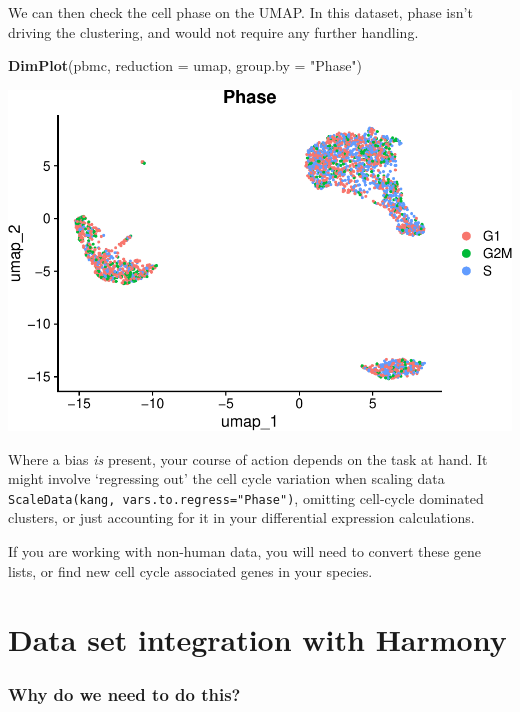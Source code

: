 \documentclass[
]{book}
\newenvironment{Shaded}{\begin{snugshade}}{\end{snugshade}}
\newcommand{\AttributeTok}[1]{\textcolor[rgb]{0.13,0.29,0.53}{#1}}
\newcommand{\FunctionTok}[1]{\textcolor[rgb]{0.13,0.29,0.53}{\textbf{#1}}}
\newcommand{\NormalTok}[1]{#1}
\newcommand{\StringTok}[1]{\textcolor[rgb]{0.31,0.60,0.02}{#1}}
\begin{document}
We can then check the cell phase on the UMAP. In this dataset, phase isn't driving the clustering, and would not require any further handling.

\begin{Shaded}
\begin{Highlighting}[]
\FunctionTok{DimPlot}\NormalTok{(pbmc, }\AttributeTok{reduction =} \StringTok{\textquotesingle{}umap\textquotesingle{}}\NormalTok{, }\AttributeTok{group.by =} \StringTok{"Phase"}\NormalTok{)}
\end{Highlighting}
\end{Shaded}

\includegraphics{scRNAseqInR_Doco_files/figure-latex/unnamed-chunk-64-1.pdf}

Where a bias \emph{is} present, your course of action depends on the task at hand. It might involve `regressing out' the cell cycle variation when scaling data \texttt{ScaleData(kang,\ vars.to.regress="Phase")}, omitting cell-cycle dominated clusters, or just accounting for it in your differential expression calculations.

If you are working with non-human data, you will need to convert these gene lists, or find new cell cycle associated genes in your species.

\hypertarget{Harmony}{%
\chapter{Data set integration with Harmony}\label{Harmony}}

\hypertarget{why-do-we-need-to-do-this-8}{%
\subsection*{Why do we need to do this?}\label{why-do-we-need-to-do-this-8}}
\end{document}
